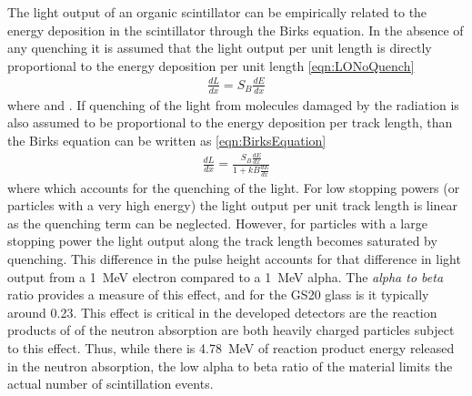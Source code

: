The light output of an organic scintillator can be empirically related to the energy deposition in the scintillator through the Birks equation.
In the absence of any quenching it is assumed that the light output per unit length is directly proportional to the energy deposition per unit length \eqref{eqn:LONoQuench}
\begin{align}
  \label{eqn:LONoQuench}
    \frac{dL}{dx} = S_B\frac{dE}{dx}
\end{align}
where  and  .
If quenching of the light from molecules damaged by the radiation is also assumed to be proportional to the energy deposition per track length, than the Birks equation can be written as \eqref{eqn:BirksEquation}
\begin{align}
  \label{eqn:BirksEquation}
    \frac{dL}{dx} = \frac{S_B\frac{dE}{dx}}{1+kB\frac{dE}{dx}}
    \end{align}
    where  which accounts for the quenching of the light.
For low stopping powers (or particles with a very high energy) the light output per unit track length is linear as the quenching term can be neglected.
However, for particles with a large stopping power the light output along the track length becomes saturated by quenching.
This difference in the pulse height accounts for that difference in light output from a \SI{1}{\MeV} electron compared to a \SI{1}{\MeV} alpha.
The \textit{alpha to beta} ratio provides a measure of this effect, and for the GS20 glass is it typically around 0.23.
This effect is critical in the developed detectors are the reaction products of of the  neutron absorption are both heavily charged particles subject to this effect.
Thus, while there is \SI{4.78}{\MeV} of reaction product energy released in the neutron absorption, the low alpha to beta ratio of the material limits the actual number of scintillation events.

